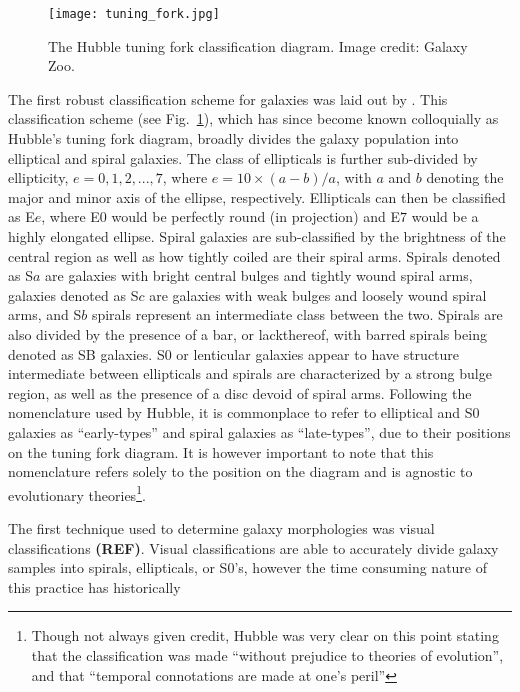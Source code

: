 \begin{figure}[!ht]
  \centering
  \texttt{[image: tuning\_fork.jpg]}
  \caption[The Hubble tuning fork classification diagram]{The Hubble
    tuning fork classification diagram.  Image 
    credit: Galaxy Zoo.}
  \label{fig:tuning_fork}
\end{figure}

The first robust classification scheme for galaxies was laid out by
\citet{hubble1926}.  This classification scheme (see
Fig.~\ref{fig:tuning_fork}), which has since become known colloquially
as Hubble's tuning fork diagram, broadly divides the galaxy
population into elliptical and spiral galaxies.  The class of
ellipticals is further sub-divided by ellipticity, $e = 0,1,2,...,7$,
where $e = 10 \times (a-b)/a$, with $a$ and $b$ denoting the major and
minor axis of the ellipse, respectively.  Ellipticals can then be
classified as E$e$, where E$0$ would be perfectly round (in
projection) and E$7$ would be a highly elongated ellipse.  Spiral
galaxies are sub-classified by the brightness of the central region as
well as how tightly coiled are their spiral arms.  Spirals denoted as
S$a$ are galaxies with bright central bulges and tightly wound spiral
arms, galaxies denoted as S$c$ are galaxies with weak bulges and
loosely wound spiral arms, and S$b$ spirals represent an intermediate
class between the two.  Spirals are also divided by the presence of a
bar, or lackthereof, with barred spirals being denoted as SB galaxies.
S$0$ or lenticular galaxies appear to have structure intermediate
between ellipticals and spirals are characterized by a strong bulge
region, as well as the presence of a disc devoid of spiral arms.
Following the nomenclature used by Hubble, it is commonplace to refer
to elliptical and S0 galaxies as ``early-types'' and spiral galaxies
as ``late-types'', due to their positions on the tuning fork diagram.
It is however important to note that this nomenclature refers solely
to the position on the diagram and is agnostic to evolutionary
theories\footnote{Though not always given credit, Hubble was
  very clear on this point stating that the classification was made
  ``without prejudice to theories of evolution'', and that ``temporal
  connotations are made at one's peril''}.
\par
The first technique used to determine galaxy morphologies was visual
classifications \textbf{(REF)}.  Visual classifications are able to
accurately divide galaxy samples into spirals, ellipticals, or S0's,
however the time consuming nature of this practice has historically
